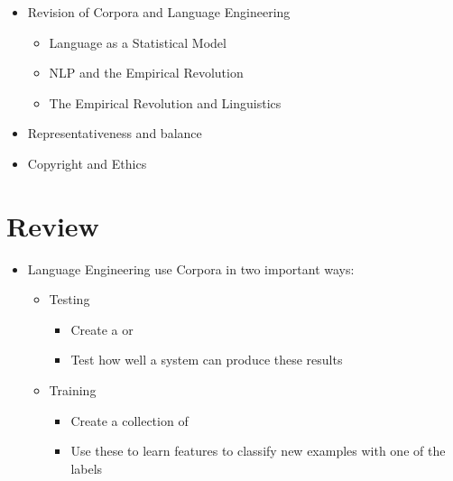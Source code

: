 \documentclass[a4paper,landscape,headrule,footrule,dvips]{foils}
\begin{document}
\begin{CJK}{UTF8}{min}

\maketitle



\begin{itemize} 
\item Revision of Corpora and Language Engineering
  \begin{itemize}
  \item Language as a Statistical Model
  \item NLP and the Empirical Revolution
  \item The Empirical Revolution and Linguistics
  \end{itemize}
\item Representativeness and balance
\item Copyright and Ethics
\end{itemize}


\section{Review}



\begin{itemize}
\item Language Engineering use Corpora in two important ways:
  \begin{itemize}
  \item Testing
    \begin{itemize}
    \item Create a  or 
    \item Test how well a system can produce these results
    \end{itemize}
  \item Training
   \begin{itemize}
    \item Create a collection of 
    \item Use these to learn features to classify new examples with
      one of the labels
    \end{itemize}


\end{itemize}
\end{itemize}
\end{CJK}
\end{document}

